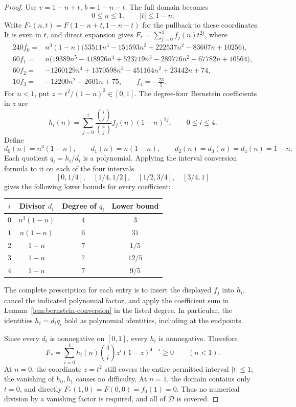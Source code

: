 \begin{proof}
Use $v=1-n+t$, $b=1-n-t$. The full domain becomes
\[
 0\le n\le1,\qquad |t|\le1-n.
\]
Write $F_*(n,t)=F(1-n+t,1-n-t)$ for the pullback to these coordinates.
It is even in $t$, and direct expansion gives
$F_*=\sum_{j=0}^4 f_j(n)t^{2j}$, where
\[
\begin{aligned}
 240f_0={}&n^3(1-n)\bigl(53511n^4-151593n^3
                 +222537n^2-83607n+10256\bigr),\\
 60f_1={}&n\bigl(19389n^5-418926n^4+523719n^3
                 -289776n^2+67782n+10564\bigr),\\
 60f_2={}&-1260129n^4+1370598n^3-451164n^2+23442n+74,\\
 10f_3={}&-12200n^2+2601n+75,\qquad
 f_4=-\frac{23}{5}.
\end{aligned}
\]
For $n<1$, put $z=t^2/(1-n)^2\in[0,1]$. The degree-four Bernstein
coefficients in $z$ are
\[
 h_i(n)=\sum_{j=0}^i
       \frac{\binom ij}{\binom4j}f_j(n)(1-n)^{2j},
 \qquad 0\le i\le4.
\]
Define
\[
 d_0(n)=n^3(1-n),\qquad d_1(n)=n(1-n),\qquad
 d_2(n)=d_3(n)=d_4(n)=1-n.
\]
Each quotient $q_i=h_i/d_i$ is a polynomial. Applying the interval
conversion formula to it on each of the four intervals
\[
 [0,1/4],\quad[1/4,1/2],\quad[1/2,3/4],\quad[3/4,1]
\]
gives the following lower bounds for every coefficient:
\begin{center}
\begin{tabular}{@{}cccc@{}}
\toprule
$i$ & Divisor $d_i$ & Degree of $q_i$ & Lower bound\\
\midrule
$0$ & $n^3(1-n)$ & $4$ & $3$\\
$1$ & $n(1-n)$ & $6$ & $31$\\
$2$ & $1-n$ & $7$ & $1/5$\\
$3$ & $1-n$ & $7$ & $12/5$\\
$4$ & $1-n$ & $7$ & $9/5$\\
\bottomrule
\end{tabular}
\end{center}
The complete prescription for each entry is to insert the displayed
$f_j$ into $h_i$, cancel the indicated polynomial factor, and apply
the coefficient sum in Lemma~\ref{lem:bernstein-conversion} in the
listed degree. In particular, the identities $h_i=d_iq_i$ hold as
polynomial identities, including at the endpoints.

Since every $d_i$ is nonnegative on $[0,1]$, every $h_i$ is
nonnegative. Therefore
\[
 F_*=\sum_{i=0}^4h_i(n)\binom4i z^i(1-z)^{4-i}\ge0
 \qquad(n<1).
\]
At $n=0$, the coordinate $z=t^2$ still covers the entire permitted
interval $|t|\le1$; the vanishing of $h_0,h_1$ causes no difficulty.
At $n=1$, the domain contains only $t=0$, and directly
$F_*(1,0)=F(0,0)=f_0(1)=0$. Thus no numerical division by a vanishing factor
is required, and all of $\mathcal D$ is covered.
\end{proof}

